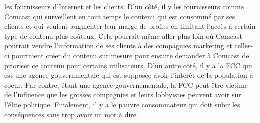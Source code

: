 \documentclass[12pt]{article}
\begin{document}
les fournisseurs d'Internet et les clients. D'un côté, il y les fournisseurs comme Comcast qui surveillent en tout temps le contenu qui est consommé par ses clients et qui veulent augmenter leur marge de profits en limitant l'accès à certain type de contenu plus coûteux. Cela pourrait même aller plus loin où Comcast pourrait vendre l'information de ses clients à des compagnies marketing et celles-ci pourraient créer du contenu sur mesure  pour ensuite demander à Comcast de prioriser ce contenu pour certains utilisateurs. D'un autre côté, il y a la FCC qui est une agence gouvernmentale qui est supposée avoir l'intérêt de la population à coeur. Par contre, étant une agence gouvernementale, la FCC peut être victime de l'influence que les grosses compagnies et leurs lobbyistes peuvent avoir sur l'élite politique. Finalement, il y a le pauvre consommateur qui doit subir les conséquences sans trop avoir un mot à dire. 
\end{document}
